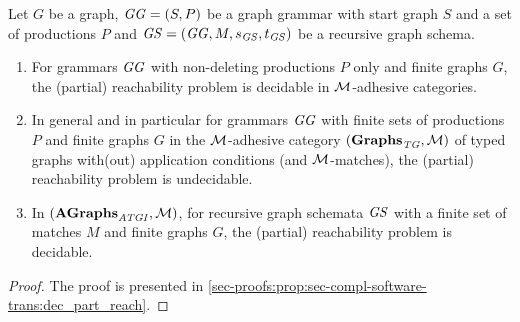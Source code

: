 % 

\begin{proposition}
\label{prop:sec-compl-software-trans:dec_part_reach}
Let $G$ be a graph, $\mathit{GG}=(S,P)$ be a graph grammar with start graph $S$ and a set of productions $P$ and $\mathit{GS}=(\mathit{GG},M,s_\mathit{GS},t_\mathit{GS})$ be a recursive graph schema.
\begin{enumerate}
  \item For grammars $\mathit{GG}$ with non-deleting productions $P$ only and finite graphs $G$, the (partial) reachability problem is decidable in ${\cal M}$-adhesive categories. 
  \item \label{item:sec-compl-software-trans:dec_part_reach2}In general and in particular for grammars $\mathit{GG}$ with finite sets of productions $P$ and finite graphs $G$ in the ${\cal M}$-adhesive category $(\mathbf{Graphs}_\mathit{TG},{\cal M})$ of typed graphs with(out) application conditions (and ${\cal M}$-matches), the (partial) reachability problem is undecidable.
  \item \label{item:sec-compl-software-trans:dec_part_reach3}In $(\mathbf{\mathbf{AGraphs}_\mathit{ATGI}},{\cal M})$, for recursive graph schemata $\mathit{GS}$ with a finite set of matches $M$ and finite graphs $G$, the (partial) reachability problem is decidable.\envEndMarker
\end{enumerate}
\end{proposition}

\begin{proof}
The proof is presented in \cref{sec-proofs:prop:sec-compl-software-trans:dec_part_reach}.
\end{proof}

